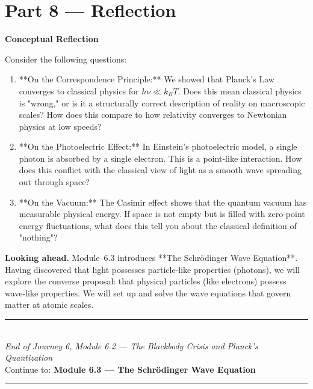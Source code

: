 \documentclass[12pt, a4paper, twoside]{book}
\begin{document}
\newpage

\section{Part 8 --- Reflection}

\begin{reflectionbox}
\textbf{Conceptual Reflection}

Consider the following questions:
\begin{enumerate}
  \item **On the Correspondence Principle:** We showed that Planck's Law converges to classical physics for $h\nu \ll k_B T$. Does this mean classical physics is "wrong," or is it a structurally correct description of reality on macroscopic scales? How does this compare to how relativity converges to Newtonian physics at low speeds?
  \item **On the Photoelectric Effect:** In Einstein's photoelectric model, a single photon is absorbed by a single electron. This is a point-like interaction. How does this conflict with the classical view of light as a smooth wave spreading out through space?
  \item **On the Vacuum:** The Casimir effect shows that the quantum vacuum has measurable physical energy. If space is not empty but is filled with zero-point energy fluctuations, what does this tell you about the classical definition of "nothing"?
\end{enumerate}
\end{reflectionbox}

\medskip
\noindent\textbf{Looking ahead.}
Module~6.3 introduces **The Schrödinger Wave Equation**. Having discovered that light possesses particle-like properties (photons), we will explore the converse proposal: that physical particles (like electrons) possess wave-like properties. We will set up and solve the wave equations that govern matter at atomic scales.

\vspace{1.4cm}
\begin{center}
{\color{teal}\rule{0.5\linewidth}{0.8pt}}\\[6pt]
{\small\color{deep}\textit{End of Journey 6, Module 6.2 --- The Blackbody Crisis and Planck's Quantization}}\\[4pt]
{\small\color{deep}Continue to: \textbf{Module 6.3 --- The Schrödinger Wave Equation}}\\[6pt]
{\color{teal}\rule{0.5\linewidth}{0.8pt}}
\end{center}
\end{document}
